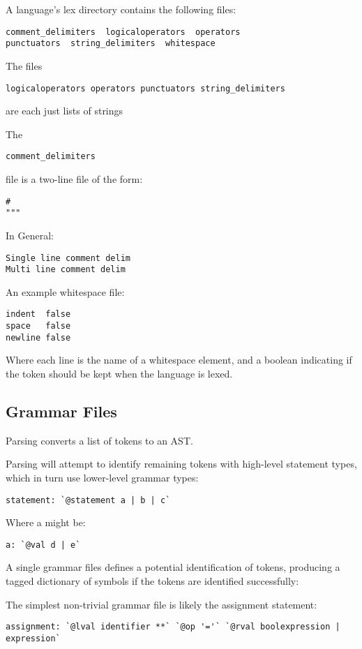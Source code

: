 \documentclass{article}
\begin{document}
A language's lex directory contains the following files:
\begin{verbatim}
comment_delimiters  logicaloperators  operators  
punctuators  string_delimiters  whitespace
\end{verbatim}

The files 
\begin{verbatim}
logicaloperators operators punctuators string_delimiters
\end{verbatim}
are each just lists of strings

The 
\begin{verbatim}
comment_delimiters  
\end{verbatim}
file is a two-line file of the form:
\begin{verbatim}
#
""" 
\end{verbatim}
In General:
\begin{verbatim}
Single line comment delim
Multi line comment delim
\end{verbatim}

An example whitespace file:
\begin{verbatim}
indent  false
space   false
newline false
\end{verbatim}
Where each line is the name of a whitespace element, and a boolean indicating if the token should be kept when the language is lexed.

\subsection{Grammar Files}

Parsing converts a list of tokens to an AST.

Parsing will attempt to identify remaining tokens with high-level statement types, which in turn use lower-level grammar types:
\begin{verbatim}
statement: `@statement a | b | c`
\end{verbatim}
Where a might be:
\begin{verbatim}
a: `@val d | e`
\end{verbatim}

A single grammar files defines a potential identification of tokens, producing a tagged dictionary of symbols if the tokens are identified successfully:

The simplest non-trivial grammar file is likely the assignment statement:
\begin{verbatim}
assignment: `@lval identifier **` `@op '='` `@rval boolexpression | expression`
\end{verbatim}
\end{document}
